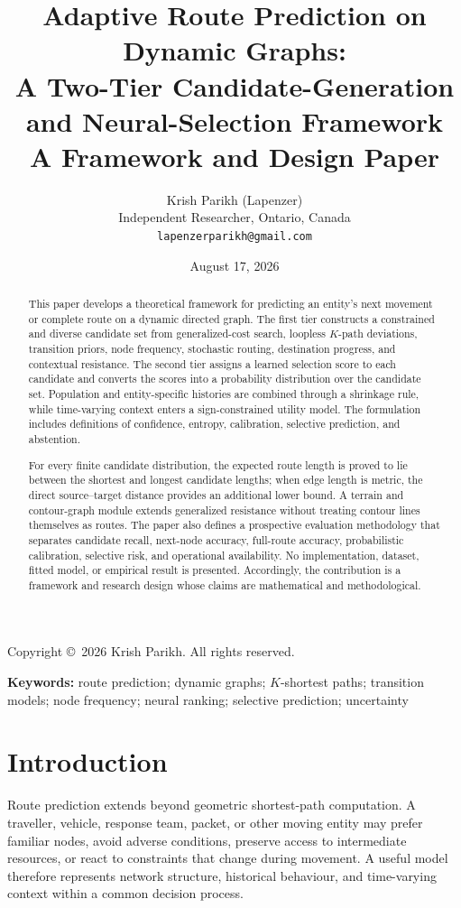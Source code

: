 \documentclass[11pt,letterpaper]{article}
\title{\textbf{Adaptive Route Prediction on Dynamic Graphs:}\\
\textbf{A Two-Tier Candidate-Generation and Neural-Selection Framework}\\[0.7em]
\large A Framework and Design Paper}
\author{Krish Parikh (Lapenzer)\\
Independent Researcher, Ontario, Canada\\
\texttt{lapenzerparikh@gmail.com}}
\date{August 17, 2026}
\begin{document}
\maketitle

\begin{center}
Copyright \copyright\ 2026 Krish Parikh. All rights reserved.
\end{center}

\begin{abstract}
This paper develops a theoretical framework for predicting an entity's next movement or complete route on a dynamic directed graph. The first tier constructs a constrained and diverse candidate set from generalized-cost search, loopless $K$-path deviations, transition priors, node frequency, stochastic routing, destination progress, and contextual resistance. The second tier assigns a learned selection score to each candidate and converts the scores into a probability distribution over the candidate set. Population and entity-specific histories are combined through a shrinkage rule, while time-varying context enters a sign-constrained utility model. The formulation includes definitions of confidence, entropy, calibration, selective prediction, and abstention.

For every finite candidate distribution, the expected route length is proved to lie between the shortest and longest candidate lengths; when edge length is metric, the direct source--target distance provides an additional lower bound. A terrain and contour-graph module extends generalized resistance without treating contour lines themselves as routes. The paper also defines a prospective evaluation methodology that separates candidate recall, next-node accuracy, full-route accuracy, probabilistic calibration, selective risk, and operational availability. No implementation, dataset, fitted model, or empirical result is presented. Accordingly, the contribution is a framework and research design whose claims are mathematical and methodological.
\end{abstract}

\noindent\textbf{Keywords:} route prediction; dynamic graphs; $K$-shortest paths; transition models; node frequency; neural ranking; selective prediction; uncertainty

\section{Introduction}

Route prediction extends beyond geometric shortest-path computation. A traveller, vehicle, response team, packet, or other moving entity may prefer familiar nodes, avoid adverse conditions, preserve access to intermediate resources, or react to constraints that change during movement. A useful model therefore represents network structure, historical behaviour, and time-varying context within a common decision process.
\end{document}
